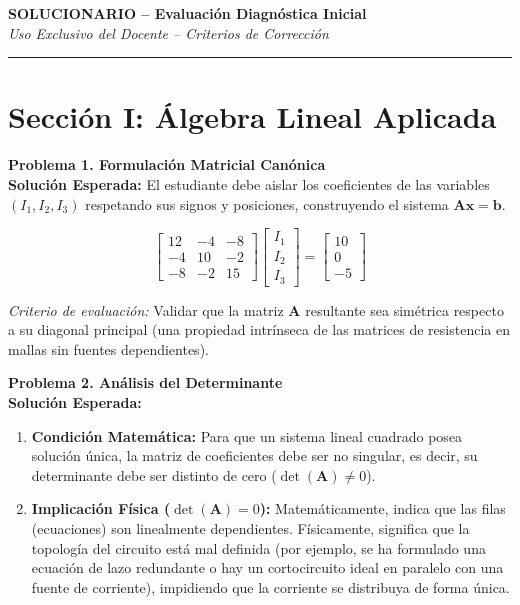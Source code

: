 \documentclass[11pt, a4paper]{article}
\begin{document}
\begin{center}
    \Large \textbf{SOLUCIONARIO -- Evaluación Diagnóstica Inicial} \\
    \vspace{0.2cm}
    \normalsize \textit{Uso Exclusivo del Docente -- Criterios de Corrección}
\end{center}

\vspace{0.5cm}
\hrule
\vspace{0.5cm}

\section*{Sección I: Álgebra Lineal Aplicada}

\textbf{Problema 1. Formulación Matricial Canónica}
\\
\textbf{Solución Esperada:} El estudiante debe aislar los coeficientes de las variables $(I_1, I_2, I_3)$ respetando sus signos y posiciones, construyendo el sistema $\mathbf{A}\mathbf{x} = \mathbf{b}$.

\begin{equation}
    \begin{bmatrix}
        12 & -4 & -8 \\
        -4 & 10 & -2 \\
        -8 & -2 & 15
    \end{bmatrix}
    \begin{bmatrix}
        I_1 \\
        I_2 \\
        I_3
    \end{bmatrix}
    =
    \begin{bmatrix}
        10 \\
        0 \\
        -5
    \end{bmatrix}
\end{equation}

\textit{Criterio de evaluación:} Validar que la matriz $\mathbf{A}$ resultante sea simétrica respecto a su diagonal principal (una propiedad intrínseca de las matrices de resistencia en mallas sin fuentes dependientes).

\vspace{0.5cm}
\textbf{Problema 2. Análisis del Determinante}
\\
\textbf{Solución Esperada:}
\begin{enumerate}
    \item \textbf{Condición Matemática:} Para que un sistema lineal cuadrado posea solución única, la matriz de coeficientes debe ser no singular, es decir, su determinante debe ser distinto de cero ($\det(\mathbf{A}) \neq 0$).
    \item \textbf{Implicación Física ($\det(\mathbf{A}) = 0$):} Matemáticamente, indica que las filas (ecuaciones) son linealmente dependientes. Físicamente, significa que la topología del circuito está mal definida (por ejemplo, se ha formulado una ecuación de lazo redundante o hay un cortocircuito ideal en paralelo con una fuente de corriente), impidiendo que la corriente se distribuya de forma única.
\end{enumerate}
\end{document}
